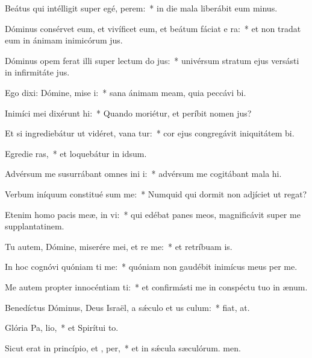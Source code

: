 \item Beátus qui intélligit super egé,  perem:~* in die mala liberábit eum minus.
\item Dóminus consérvet eum, et vivíficet eum, et beátum fáciat e  ra:~* et non tradat eum in ánimam inimicórum jus.
\item Dóminus opem ferat illi super lectum do jus:~* univérsum stratum ejus versásti in infirmitáte jus.
\item Ego dixi: Dómine, mise i:~* sana ánimam meam, quia peccávi bi.
\item Inimíci mei dixérunt  hi:~* Quando moriétur, et períbit nomen jus?
\item Et si ingrediebátur ut vidéret, vana tur:~* cor ejus congregávit iniquitátem bi.
\item Egredie ras,~* et loquebátur in idsum.
\item Advérsum me susurrábant omnes ini i:~* advérsum me cogitábant mala hi.
\item Verbum iníquum constitué sum me:~* Numquid qui dormit non adjíciet ut regat?
\item Etenim homo pacis meæ, in  vi:~* qui edébat panes meos, magnificávit super me supplantatinem.
\item Tu autem, Dómine, miserére mei, et re me:~* et retríbuam is.
\item In hoc cognóvi quóniam ti me:~* quóniam non gaudébit inimícus meus per me.
\item Me autem propter innocéntiam ti:~* et confirmásti me in conspéctu tuo in ænum.
\item Benedíctus Dóminus, Deus Israël, a sǽculo et us  culum:~* fiat, at.
\item Glória Pa,  lio,~* et Spirítui to.
\item Sicut erat in princípio, et ,  per,~* et in sǽcula sæculórum. men.
